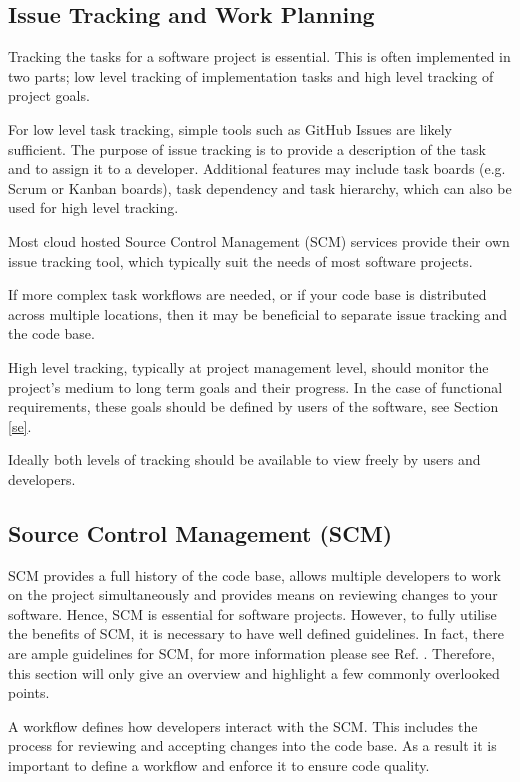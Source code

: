 \documentclass[jnr]{iosart2x}
\begin{document}
\subsection{Issue Tracking and Work Planning}
\label{Issue tracking and work planning}

Tracking the tasks for a software project is essential.
This is often implemented in two parts; low level tracking of implementation tasks and high level tracking of project goals.

For low level task tracking, simple tools such as GitHub Issues are likely sufficient.
The purpose of issue tracking is to provide a description of the task and to assign it to a developer.
Additional features may include task boards (e.g. Scrum or Kanban boards), task dependency and task hierarchy, which can also be used for high level tracking.

Most cloud hosted Source Control Management (SCM) services provide their own issue tracking tool, which typically suit the needs of most software projects.

If more complex task workflows are needed, or if your code base is distributed across multiple locations, then it may be beneficial to separate issue tracking and the code base.

High level tracking, typically at project management level, should monitor the project's medium to long term goals and their progress.
In the case of functional requirements, these goals should be defined by users of the software, see Section \ref{se}.

Ideally both levels of tracking should be available to view freely by users and developers.

\subsection{Source Control Management (SCM)}
\label{Source control management}

SCM provides a full history of the code base, allows multiple developers to work on the project simultaneously and provides means on reviewing changes to your software.
Hence, SCM is essential for software projects.
However, to fully utilise the benefits of SCM, it is necessary to have well defined guidelines.
In fact, there are ample guidelines for SCM, for more information please see Ref. \cite{awesome-git}.
Therefore, this section will only give an overview and highlight a few commonly overlooked points.

A workflow defines how developers interact with the SCM.
This includes the process for reviewing and accepting changes into the code base.
As a result it is important to define a workflow and enforce it to ensure code quality.
\end{document}
